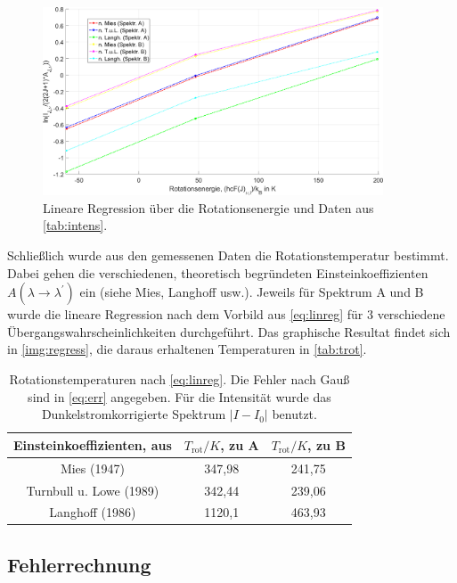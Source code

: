 \documentclass[numbers=noenddot,a4paper,notitlepage,twoside,BCOR15mm]{scrartcl}
\newcommand{\ix}[1]{_\text{#1}}
\begin{document}
				\begin{figure}
					\centering
					\includegraphics[width=0.9\textwidth]{linear_reg.png}
					\caption{Lineare Regression über die Rotationsenergie und Daten aus \autoref{tab:intens}.}
					\label{img:regress}
				\end{figure}

			Schließlich wurde aus den gemessenen Daten die Rotationstemperatur bestimmt. Dabei gehen die verschiedenen, theoretisch begründeten Einsteinkoeffizienten $A(\lambda\rightarrow\lambda^\prime)$ ein (siehe Mies, Langhoff usw.). Jeweils für Spektrum A und B wurde die lineare Regression nach dem Vorbild aus \autoref{eq:linreg} für 3 verschiedene Übergangswahrscheinlichkeiten durchgeführt. Das graphische Resultat findet sich in \autoref{img:regress}, die daraus erhaltenen Temperaturen in \autoref{tab:trot}.

				\begin{table}
					\centering
					\begin{tabular}{c|c|c}
						Einsteinkoeffizienten, aus \cite{EMAUGreifswaldOHRot} & $T\ix{rot}/\unit{K}$, zu A & $T\ix{rot}/\unit{K}$, zu B\\
						\hline Mies (1947) & 347,98 & 241,75 \\
						\hline Turnbull u. Lowe (1989) & 342,44 & 239,06 \\
						\hline Langhoff (1986) & 1120,1 & 463,93
					\end{tabular}
					\caption{Rotationstemperaturen nach \autoref{eq:linreg}. Die Fehler nach Gauß sind in \autoref{eq:err} angegeben. Für die Intensität wurde das Dunkelstromkorrigierte Spektrum $|I-I\ix{0}|$ benutzt.}
					\label{tab:trot}
				\end{table}

		\subsection{Fehlerrechnung}
\end{document}
